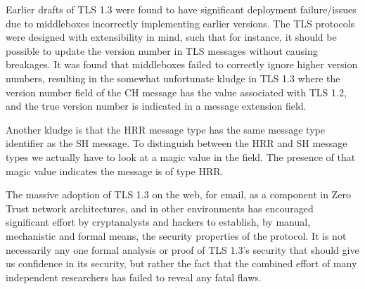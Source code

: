 
Earlier drafts of \ac{TLS} 1.3 were found to have significant deployment failure/issues due to middleboxes incorrectly implementing earlier versions.
The \ac{TLS} protocols were designed with
extensibility in mind, such that for instance,
it should be possible to update the version
number in \ac{TLS} messages without causing breakages.
It was found that middleboxes failed to correctly
ignore higher version numbers,
resulting in the somewhat unfortunate kludge
in \ac{TLS} 1.3 where the version number field of the
\ac{CH} message
has the value associated with \ac{TLS} 1.2,
and the true version number is indicated
in a message extension field.

Another kludge is that the \ac{HRR}
message type has the same message type
identifier as the \ac{SH} message.
To distinguish between the \ac{HRR} and \ac{SH} message types we actually
have to look at a magic value in the
 field.
The presence of that magic
value indicates the message is of type \ac{HRR}.



The massive adoption of \ac{TLS} 1.3 on the web,
for email,
as a component in Zero Trust network architectures,
and in other environments has encouraged
significant effort by cryptanalysts
and hackers to establish, by
manual, mechanistic and formal means,
the security properties of the protocol.
It is not necessarily any one formal analysis or proof
of \ac{TLS} 1.3's security that should give us confidence in its
security, but rather the fact that the combined effort of
many independent researchers has failed to reveal
any fatal flaws.

